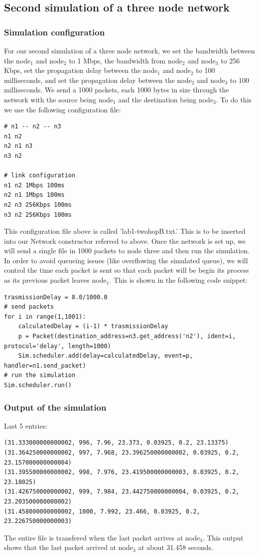 \documentclass[fleqn,11pt]{article}
\begin{document}
\subsection{Second simulation of a three node network}
\subsubsection{Simulation configuration}
For our second simulation of a three node network, we set the bandwidth between the node$_1$ and node$_2$ to 1 Mbps, the bandwidth from node$_2$ and node$_3$  to 256 Kbps, set the propagation delay between the node$_1$ and node$_2$  to 100 milliseconds, and set the propagation delay between the node$_2$ and node$_3$ to 100 milliseconds. We send a 1000 packets, each 1000 bytes in size through the network with the source being node$_1$ and the destination being node$_3$. To do this we use the following configuration file:
\begin{lstlisting}
# n1 -- n2 -- n3
n1 n2
n2 n1 n3
n3 n2

# link configuration
n1 n2 1Mbps 100ms
n2 n1 1Mbps 100ms
n2 n3 256Kbps 100ms
n3 n2 256Kbps 100ms
\end{lstlisting}
This configuration file above is called 'lab1-twohopB.txt.' This is to be inserted into our Network constructor referred to above.
Once the network is set up, we will send a single file in 1000 packets to node three and then run the simulation. In order to avoid queueing issues (like overflowing the simulated queue), we will control the time each packet is sent so that each packet will be begin its process as its previous packet leaves node$_1$. This is shown in the following code snippet:    

\begin{lstlisting}
trasmissionDelay = 8.0/1000.0    
# send packets
for i in range(1,1001):
    calculatedDelay = (i-1) * trasmissionDelay
    p = Packet(destination_address=n3.get_address('n2'), ident=i, protocol='delay', length=1000)
    Sim.scheduler.add(delay=calculatedDelay, event=p, handler=n1.send_packet)
# run the simulation
Sim.scheduler.run() 
\end{lstlisting}
\subsubsection{Output of the simulation}
Last 5 entries:
\begin{lstlisting}
(31.333000000000002, 996, 7.96, 23.373, 0.03925, 0.2, 23.13375)
(31.364250000000002, 997, 7.968, 23.396250000000002, 0.03925, 0.2, 23.157000000000004)
(31.395500000000002, 998, 7.976, 23.419500000000003, 0.03925, 0.2, 23.18025)
(31.426750000000002, 999, 7.984, 23.442750000000004, 0.03925, 0.2, 23.203500000000002)
(31.458000000000002, 1000, 7.992, 23.466, 0.03925, 0.2, 23.226750000000003)
\end{lstlisting}
The entire file is transfered when the last packet arrives at node$_3$. This output shows that the last packet arrived at node$_3$ at about 31.458 seconds.
\end{document}
